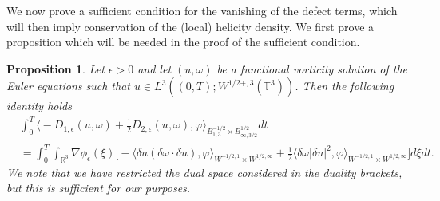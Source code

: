 \documentclass[12pt,a4paper]{article}
\newtheorem{proposition}[theorem]{Proposition}
\theoremstyle{definition}
\theoremstyle{remark}
\numberwithin{equation}{section}
\begin{document}
We now prove a sufficient condition for the vanishing of the defect terms, which will then imply conservation of the (local) helicity density. We first prove a proposition which will be needed in the proof of the sufficient condition.
\begin{proposition} \label{defectidentitylemma}
Let $\epsilon > 0$ and let $(u, \omega)$ be a functional vorticity solution of the Euler equations such that $u \in L^3 ((0,T); W^{1/2+,3} (\mathbb{T}^3))$. Then the following identity holds
\begin{align}
&\int_0^T \bigg\langle - D_{1,\epsilon} (u, \omega) + \frac{1}{2} D_{2,\epsilon} (u, \omega) , \varphi \bigg\rangle_{B^{-1/2}_{1,3} \times B^{1/2}_{\infty,3/2}} dt \nonumber \\
&= \int_0^T \int_{\mathbb{R}^3} \nabla \phi_\epsilon (\xi) \bigg[- \langle \delta u (\delta \omega \cdot \delta u), \varphi \rangle_{W^{-1/2,1} \times W^{1/2,\infty}} + \frac{1}{2} \langle \delta \omega \lvert \delta u \rvert^2 , \varphi \rangle_{W^{-1/2,1} \times W^{1/2,\infty}} \bigg] d \xi dt. \label{defectidentity}
\end{align}
We note that we have restricted the dual space considered in the duality brackets, but this is sufficient for our purposes. 
\end{proposition}
\end{document}
